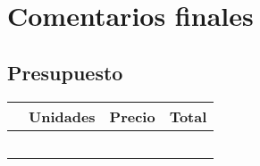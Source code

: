 

\chapter{Comentarios finales}
\label{chap:conclusiones}

\section{Presupuesto}


\begin{table}[H]
  \begin{center}
    \begin{tabular}{|p{8cm}|p{2cm}|p{2cm}|p{2cm}|}
      \hline
      \vspace{+0.2in}{\textbf{Descripción}} & {\textbf{Unidades}} & {\textbf{Precio \EUR{}}} & {\textbf{Total \EUR{}}}\\
      \hline
      \vspace{+0.2in}{Surveyor SRV-1 Blackfin Robot} &  \vspace{+0.2in}{1} &  \vspace{+0.2in}{379,8} &  \vspace{+0.2in}{379,8}\\
      \hline
      \vspace{+0.2in}{Router WIFI Xavi 7968} & \vspace{+0.2in}{1} & \vspace{+0.2in}{35} & \vspace{+0.2in}{35}\\
      \hline
      \vspace{+0.2in}{Capturadora de vídeo} & \vspace{+0.2in}{1} & \vspace{+0.2in}{15} & \vspace{+0.2in}{15}\\
      \hline      
      \vspace{+0.2in}{Cámara y receptor inalámbrico} & \vspace{+0.2in}{1} & \vspace{+0.2in}{54} & \vspace{+0.2in}{54}\\
      \hline      
      \vspace{+0.2in}{Gamepad} & \vspace{+0.2in}{1} & \vspace{+0.2in}{10} & \vspace{+0.2in}{10}\\

\end{tabular}
\end{center}
\end{table}
